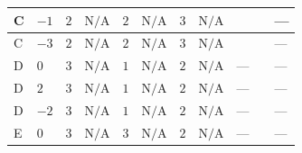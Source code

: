 \documentclass[8pt]{article}
\begin{document}
\begin{landscape}
\begin{longtable}{@{}llcccccc >{\raggedright\arraybackslash}p{0.21\linewidth} >{\raggedright\arraybackslash}p{0.21\linewidth} >{\raggedright\arraybackslash}p{0.21\linewidth}@{}}
C & $-1$ & $2$ & $\text{N/A}$ & $2$ & $\text{N/A}$ & $3$ & $\text{N/A}$ & \scriptsize\adjustbox{max width=\linewidth}{$\begin{gathered} {\lambda_{HS_1}^{(A)}} (6 \operatorname{Tr}\!\left({Y_d}\,\left({Y_d}\right)^{\dagger}\right)+2 \operatorname{Tr}\!\left({Y_e}\,\left({Y_e}\right)^{\dagger}\right)+6 \operatorname{Tr}\!\left({Y_u}\,\left({Y_u}\right)^{\dagger}\right))\end{gathered}$} & \scriptsize\adjustbox{max width=\linewidth}{$\begin{gathered} +\frac{16}{3} {\lambda_5} \left({\lambda_5}\right)^{*}\end{gathered}$} & --- \\
\midrule
C & $-3$ & $2$ & $\text{N/A}$ & $2$ & $\text{N/A}$ & $3$ & $\text{N/A}$ & \scriptsize\adjustbox{max width=\linewidth}{$\begin{gathered} {\lambda_{HS_1}^{(A)}} (6 \operatorname{Tr}\!\left({Y_d}\,\left({Y_d}\right)^{\dagger}\right)+2 \operatorname{Tr}\!\left({Y_e}\,\left({Y_e}\right)^{\dagger}\right)+6 \operatorname{Tr}\!\left({Y_u}\,\left({Y_u}\right)^{\dagger}\right))\end{gathered}$} & \scriptsize\adjustbox{max width=\linewidth}{$\begin{gathered} +\frac{16}{3} {\lambda_5} \left({\lambda_5}\right)^{*}\end{gathered}$} & --- \\
\midrule
D & $0$ & $3$ & $\text{N/A}$ & $1$ & $\text{N/A}$ & $2$ & $\text{N/A}$ & --- & \scriptsize\adjustbox{max width=\linewidth}{$\begin{gathered} -\frac{8}{3} {\lambda_5} \left({\lambda_5}\right)^{*}\end{gathered}$} & --- \\
\midrule
D & $2$ & $3$ & $\text{N/A}$ & $1$ & $\text{N/A}$ & $2$ & $\text{N/A}$ & --- & \scriptsize\adjustbox{max width=\linewidth}{$\begin{gathered} -\frac{8}{3} {\lambda_5} \left({\lambda_5}\right)^{*}\end{gathered}$} & --- \\
\midrule
D & $-2$ & $3$ & $\text{N/A}$ & $1$ & $\text{N/A}$ & $2$ & $\text{N/A}$ & --- & \scriptsize\adjustbox{max width=\linewidth}{$\begin{gathered} -\frac{8}{3} {\lambda_5} \left({\lambda_5}\right)^{*}\end{gathered}$} & --- \\
\midrule
E & $0$ & $3$ & $\text{N/A}$ & $3$ & $\text{N/A}$ & $2$ & $\text{N/A}$ & --- & \scriptsize\adjustbox{max width=\linewidth}{$\begin{gathered} -\frac{4}{3} {\lambda_5} \left({\lambda_5}\right)^{*}\end{gathered}$} & --- \\

\end{longtable}
\end{landscape}
\end{document}
